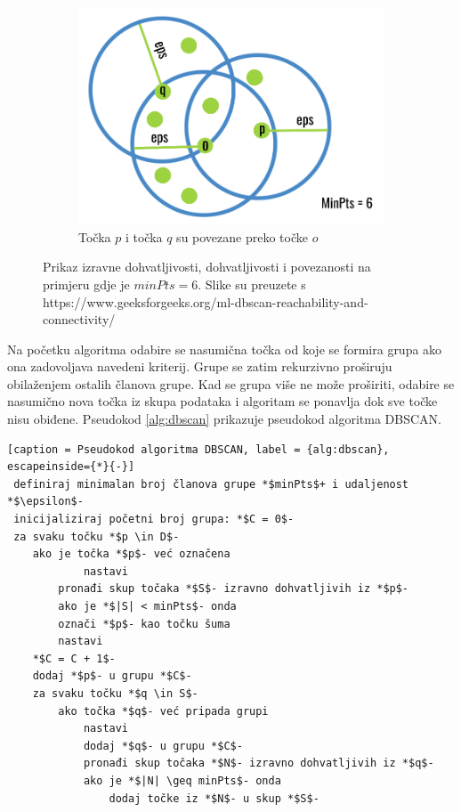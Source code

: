 \documentclass[utf8, diplomski, numeric]{fer}
\begin{document}
\begin{figure}[htp]
\begin{subfigure}{.3\textwidth}
\includegraphics[width=1\textwidth]{images/dbscan3.png}
\caption{Točka $p$ i točka $q$ su povezane preko točke $o$}
\end{subfigure}
\caption{Prikaz izravne dohvatljivosti, dohvatljivosti i povezanosti na primjeru gdje je $minPts = 6$. Slike su preuzete s https://www.geeksforgeeks.org/ml-dbscan-reachability-and-connectivity/}
\label{fig:dbscan-dohvatljivost}
\end{figure}

Na početku algoritma odabire se nasumična točka od koje se formira grupa ako ona zadovoljava navedeni kriterij. Grupe se zatim rekurzivno proširuju obilaženjem ostalih članova grupe. Kad se grupa više ne može proširiti, odabire se nasumično nova točka iz skupa podataka i algoritam se ponavlja dok sve točke nisu obiđene. Pseudokod \ref{alg:dbscan} prikazuje pseudokod algoritma DBSCAN.

\begin{lstlisting}[caption = Pseudokod algoritma DBSCAN, label = {alg:dbscan}, escapeinside={*}{-}]
 definiraj minimalan broj članova grupe *$minPts$+ i udaljenost *$\epsilon$-
 inicijaliziraj početni broj grupa: *$C = 0$-
 za svaku točku *$p \in D$-
 	ako je točka *$p$- već označena
       		nastavi
    	pronađi skup točaka *$S$- izravno dohvatljivih iz *$p$-
    	ako je *$|S| < minPts$- onda 
 		označi *$p$- kao točku šuma
 	   	nastavi
 	*$C = C + 1$-
 	dodaj *$p$- u grupu *$C$-
	za svaku točku *$q \in S$-
	  	ako točka *$q$- već pripada grupi
	  		nastavi
	      	dodaj *$q$- u grupu *$C$-
	      	pronađi skup točaka *$N$- izravno dohvatljivih iz *$q$-
	      	ako je *$|N| \geq minPts$- onda 
	         	dodaj točke iz *$N$- u skup *$S$-

\end{lstlisting}
\end{document}
